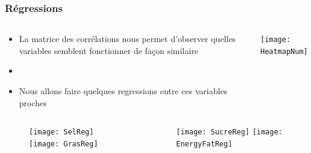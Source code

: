 \subsubsection{Régressions}
\begin{frame}{\insertsubsubsection}
  \begin{columns}
    \begin{column}{.5\textwidth}
      \begin{itemize}
        \item La matrice des corrélations nous permet d'observer quelles variables
        semblent fonctionner de façon similaire
        \item[]
        \item Nous allons faire quelques regressions entre ces variables proches
      \end{itemize}
    \end{column}
    \begin{column}{.5\textwidth}
      \texttt{[image: HeatmapNum]}
    \end{column}
  \end{columns}  
\end{frame}

\begin{frame}{\insertsubsubsection}
  \begin{columns}
    \begin{column}{.5\textwidth}
      \begin{figure}
        \texttt{[image: SelReg]}
        \texttt{[image: GrasReg]}
      \end{figure}      
    \end{column}
    \begin{column}{.5\textwidth}
      \begin{figure}
        \texttt{[image: SucreReg]}
        \texttt{[image: EnergyFatReg]}
      \end{figure}      
    \end{column}
  \end{columns}
\end{frame}

